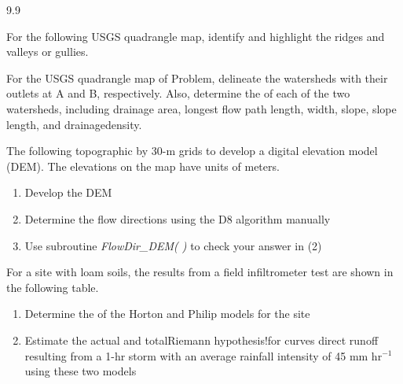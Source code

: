 \begin{problemlist}{9.9}
\item \label{ch01:prob3.1} For the following USGS quadrangle
    map, identify and highlight the ridges and valleys or
    gullies.

\begin{figure}[!h]
\hspace*{18pt}
\end{figure}

\item \label{ch01:prob3.2} For the USGS quadrangle map of
    Problem, delineate the watersheds with their outlets at A
    and B, respectively. Also, determine the of each of the two watersheds, including
    drainage area, longest flow path length, width, slope,
    slope length, and drainage\break density.

\item \label{ch01:prob3.3} The following topographic by 30-m grids to develop a digital
    elevation model (DEM). The elevations on the map have units
    of meters.
\begin{enumerate}[(3)]
\item[(1)] Develop the DEM

\item[(2)] Determine the flow directions using the D8 algorithm
manually

\item[(3)] Use subroutine \textit{FlowDir{\_}DEM( )} to check your
answer in (2)
\end{enumerate}

\item\label{ch01:prob3.15} For a site with loam soils, the
    results from a field infiltrometer test are shown in the
    following table.
\begin{enumerate}[(2)]
\item[(1)] Determine the of the Horton and Philip models for
the site

\item[(2)] Estimate the actual and totalRiemann hypothesis!for
    curves direct
    runoff resulting from a 1-hr storm with an average
    rainfall intensity of 45 mm hr$^{-1}$ using these two
    models

\bigskip


\end{enumerate}
\end{problemlist}
